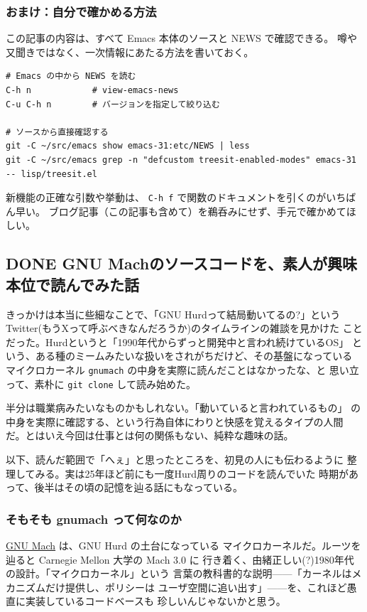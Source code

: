 \documentclass[11pt]{article}
\begin{document}
\subsubsection{おまけ：自分で確かめる方法}
\label{sec:org74149e8}

この記事の内容は、すべて Emacs 本体のソースと NEWS で確認できる。
噂や又聞きではなく、一次情報にあたる方法を書いておく。

\begin{verbatim}
# Emacs の中から NEWS を読む
C-h n            # view-emacs-news
C-u C-h n        # バージョンを指定して絞り込む

# ソースから直接確認する
git -C ~/src/emacs show emacs-31:etc/NEWS | less
git -C ~/src/emacs grep -n "defcustom treesit-enabled-modes" emacs-31 -- lisp/treesit.el
\end{verbatim}

新機能の正確な引数や挙動は、 \texttt{C-h f} で関数のドキュメントを引くのがいちばん早い。
ブログ記事（この記事も含めて）を鵜呑みにせず、手元で確かめてほしい。
\subsection{{\bfseries\sffamily DONE} GNU Machのソースコードを、素人が興味本位で読んでみた話}
\label{sec:org1c6067b}
きっかけは本当に些細なことで、「GNU Hurdって結局動いてるの?」という
Twitter(もうXって呼ぶべきなんだろうか)のタイムラインの雑談を見かけた
ことだった。Hurdというと「1990年代からずっと開発中と言われ続けているOS」
という、ある種のミームみたいな扱いをされがちだけど、その基盤になっている
マイクロカーネル \texttt{gnumach} の中身を実際に読んだことはなかったな、と
思い立って、素朴に \texttt{git clone} して読み始めた。

半分は職業病みたいなものかもしれない。「動いていると言われているもの」
の中身を実際に確認する、という行為自体にわりと快感を覚えるタイプの人間
だ。とはいえ今回は仕事とは何の関係もない、純粋な趣味の話。

以下、読んだ範囲で「へぇ」と思ったところを、初見の人にも伝わるように
整理してみる。実は25年ほど前にも一度Hurd周りのコードを読んでいた
時期があって、後半はその頃の記憶を辿る話にもなっている。
\subsubsection{そもそも gnumach って何なのか}
\label{sec:orgf7f1fe3}

\href{https://github.com/flavioc/gnumach}{GNU Mach} は、GNU Hurd の土台になっている
マイクロカーネルだ。ルーツを辿ると Carnegie Mellon 大学の Mach 3.0 に
行き着く、由緒正しい(?)1980年代の設計。「マイクロカーネル」という
言葉の教科書的な説明——「カーネルはメカニズムだけ提供し、ポリシーは
ユーザ空間に追い出す」——を、これほど愚直に実装しているコードベースも
珍しいんじゃないかと思う。
\end{document}
